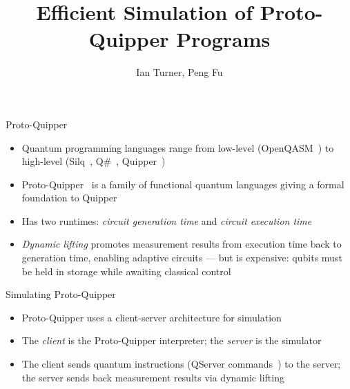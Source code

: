 \documentclass{beamer}
\title{Efficient Simulation of Proto-Quipper Programs}
\author{Ian Turner, Peng Fu}
\date{}
\begin{document}
\begin{frame}
  \titlepage
\end{frame}

\begin{frame}{Proto-Quipper}
  \begin{itemize}
    \item Quantum programming languages range from low-level (OpenQASM~\cite{cross2022openqasm}) to high-level (Silq~\cite{bichsel2020silq}, Q\#~\cite{svore2018q}, Quipper~\cite{green2013quipper})
    \item Proto-Quipper~\cite{fu2023proto,fu2024proto} is a family of functional quantum languages giving a formal foundation to Quipper
    \item Has two runtimes: \emph{circuit generation time} and \emph{circuit execution time}
    \item \emph{Dynamic lifting} promotes measurement results from execution time back to generation time, enabling adaptive circuits --- but is expensive: qubits must be held in storage while awaiting classical control
  \end{itemize}
\end{frame}

\begin{frame}{Simulating Proto-Quipper}
  \begin{itemize}
    \item Proto-Quipper uses a client-server architecture for simulation~\cite{fu2023proto}
    \item The \emph{client} is the Proto-Quipper interpreter; the \emph{server} is the simulator
    \item The client sends quantum instructions (QServer commands~\cite{fu2023proto}) to the server; the server sends back measurement results via dynamic lifting
  \end{itemize}
  \begin{center}
  \end{center}
\end{frame}
\end{document}
